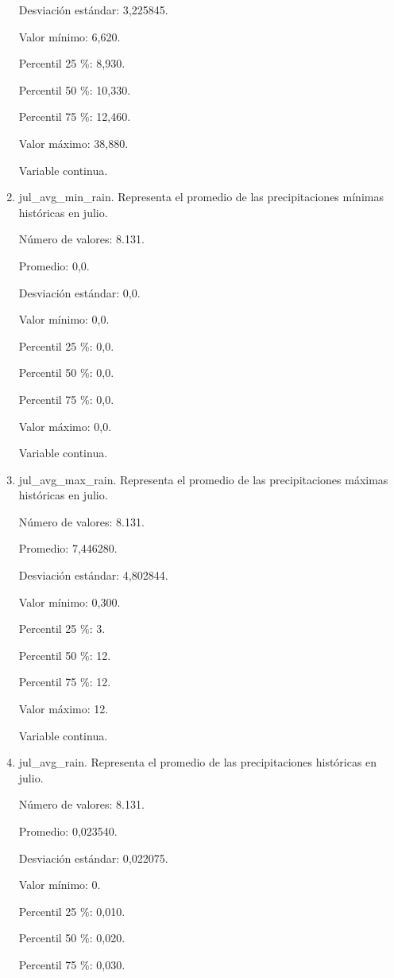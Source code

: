 \begin{enumerate}
	Desviación estándar: 3,225845.
	
	Valor mínimo: 6,620.
	
	Percentil 25 \%: 8,930.
	
	Percentil 50 \%: 10,330.
	
	Percentil 75 \%: 12,460.
	
	Valor máximo: 38,880.
	
	Variable continua.

	\item jul\_avg\_min\_rain. Representa el promedio de las precipitaciones mínimas históricas en julio.
	
	Número de valores: 8.131.
	
	Promedio: 0,0.
	
	Desviación estándar: 0,0.
	
	Valor mínimo: 0,0.
	
	Percentil 25 \%: 0,0.
	
	Percentil 50 \%: 0,0.
	
	Percentil 75 \%: 0,0.
	
	Valor máximo: 0,0.
	
	Variable continua.

	\item jul\_avg\_max\_rain. Representa el promedio de las precipitaciones máximas históricas en julio.
	
	Número de valores: 8.131.
	
	Promedio: 7,446280.
	
	Desviación estándar: 4,802844.
	
	Valor mínimo: 0,300.
	
	Percentil 25 \%: 3.
	
	Percentil 50 \%: 12.
	
	Percentil 75 \%: 12.
	
	Valor máximo: 12.
	
	Variable continua.

	\item jul\_avg\_rain. Representa el promedio de las precipitaciones históricas en julio.
	
	Número de valores: 8.131.
	
	Promedio: 0,023540.
	
	Desviación estándar: 0,022075.
	
	Valor mínimo: 0.
	
	Percentil 25 \%: 0,010.
	
	Percentil 50 \%: 0,020.
	
	Percentil 75 \%: 0,030.
	

\end{enumerate}
